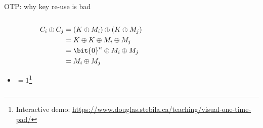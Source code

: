 \documentclass[aspectratio=169, lualatex, handout]{beamer}
\begin{document}
\begin{frame}{OTP: why key re-use is bad}
	\begin{columns}[c]
		\begin{column}{0.5\textwidth}
			\begin{align*}
				C_i \oplus C_j & = (K \oplus M_i) \oplus (K \oplus M_j) \\
				               & = K \oplus K \oplus M_i \oplus M_j     \\
				               & = \bit{0}^n \oplus M_i \oplus M_j      \\
				               & = M_i \oplus M_j
			\end{align*}
			\begin{itemize}
				\item {} $= 1$\footnote{Interactive demo: \url{https://www.douglas.stebila.ca/teaching/visual-one-time-pad/}}
			\end{itemize}
		\end{column}
		\begin{column}{0.5\textwidth}
			\begin{flushright}
			\end{flushright}
		\end{column}
	\end{columns}
\end{frame}
\end{document}
